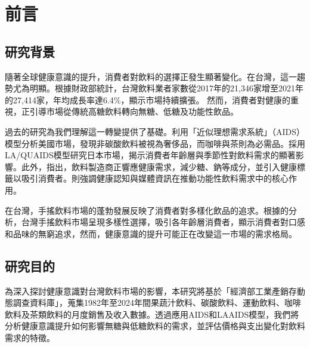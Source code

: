 \section{前言}

\subsection{研究背景}

隨著全球健康意識的提升，消費者對飲料的選擇正發生顯著變化。在台灣，這一趨勢尤為明顯。根據財政部統計，台灣飲料業者家數從2017年的21,346家增至2021年的27,414家，年均成長率達6.4\%，顯示市場持續擴張\citep{twtrend2022beverage}。
然而，消費者對健康的重視，正引導市場從傳統高糖飲料轉向無糖、低糖及功能性飲品\citep{RN3}。

過去的研究為我們理解這一轉變提供了基礎。\citet{RN2}利用「近似理想需求系統」（AIDS）模型分析美國市場，發現非碳酸飲料被視為奢侈品，而咖啡與茶則為必需品。\citet{RN1}採用LA/QUAIDS模型研究日本市場，揭示消費者年齡層與季節性對飲料需求的顯著影響。此外，\citet{RN9}指出，飲料製造商正響應健康需求，減少糖、鈉等成分，並引入健康標籤以吸引消費者。\citet{RN15}則強調健康認知與媒體資訊在推動功能性飲料需求中的核心作用。

在台灣，手搖飲料市場的蓬勃發展反映了消費者對多樣化飲品的追求。根據\citet{lndata2022taiwandrink}的分析，台灣手搖飲料市場呈現多樣性選擇，吸引各年齡層消費者，顯示消費者對口感和品味的無窮追求，然而，健康意識的提升可能正在改變這一市場的需求格局。

\subsection{研究目的}

為深入探討健康意識對台灣飲料市場的影響，本研究將基於「經濟部工業產銷存動態調查資料庫」\citep{moea_statistics}，蒐集1982年至2024年間果蔬汁飲料、碳酸飲料、運動飲料、咖啡飲料及茶類飲料的月度銷售及收入數據。透過應用AIDS和LAAIDS模型，我們將分析健康意識提升如何影響無糖與低糖飲料的需求，並評估價格與支出變化對飲料需求的特徵。